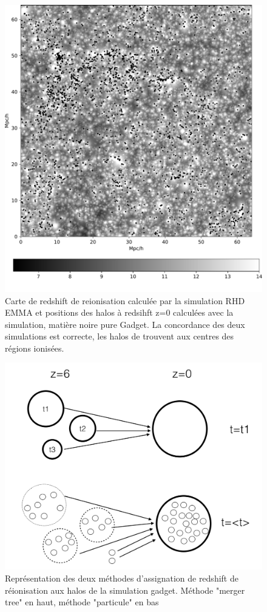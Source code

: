 \begin{figure}
		\centering
        \includegraphics[width=.95\linewidth]{img/05/maphaloh.pdf} 
        \caption[Carte de redshift et halos]{Carte de redshift de reionisation calculée par la simulation \ac{RHD} EMMA et positions des halos à redsihft z=0 calculées avec la simulation, matière noire pure Gadget.
        La concordance des deux simulations est correcte, les halos de trouvent aux centres des régions ionisées.
		\label{fig:zmapcomp}}
\end{figure}


\begin{figure}
		\centering
        \includegraphics[width=.95\linewidth]{img/05/method.pdf} 
        \caption[Methodes]{Représentation des deux méthodes d'assignation de redshift de réionisation aux halos de la simulation gadget.
        Méthode "merger tree" en haut, méthode "particule" en bas
		\label{fig:methodes}}
\end{figure}


